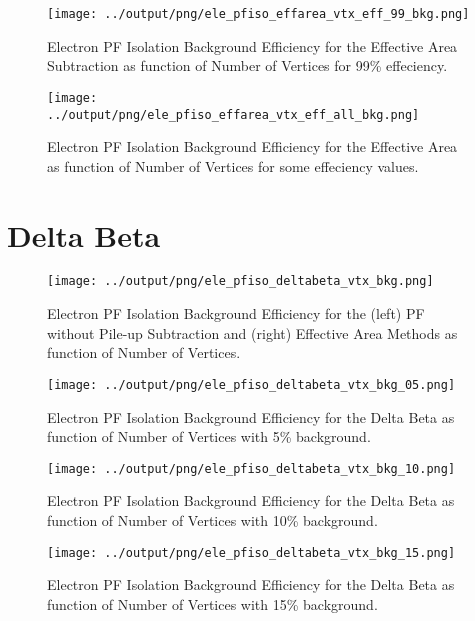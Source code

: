 \documentclass[11pt]{book}
\begin{document}
\begin{figure}[htb]
\centering
\texttt{[image: ../output/png/ele\_pfiso\_effarea\_vtx\_eff\_99\_bkg.png]}
\caption{Electron PF Isolation Background Efficiency for the Effective Area Subtraction as function of Number of Vertices for 99\% effeciency.}
\label{fig:ele_pfiso_vtx_eff_effarea_eff_99_bkg}
\end{figure}

\begin{figure}[htb]
\centering
\texttt{[image: ../output/png/ele\_pfiso\_effarea\_vtx\_eff\_all\_bkg.png]}
\caption{Electron PF Isolation Background Efficiency for the Effective Area as function of Number of Vertices for some effeciency values.}
\label{fig:ele_pfiso_vtx_eff_effarea_eff_all_bkg}
\end{figure}
\clearpage

\section{Delta Beta}
\begin{figure}[htb]
\centering
\texttt{[image: ../output/png/ele\_pfiso\_deltabeta\_vtx\_bkg.png]}
\caption{Electron PF Isolation Background Efficiency for the (left) PF without Pile-up Subtraction and (right) Effective Area Methods as function of Number of Vertices.}
\label{fig:ele_pfiso_vtx_bkg_deltabeta}
\end{figure}

\begin{figure}[htb]
\centering
\texttt{[image: ../output/png/ele\_pfiso\_deltabeta\_vtx\_bkg\_05.png]}
\caption{Electron PF Isolation Background Efficiency for the Delta Beta as function of Number of Vertices with 5\% background.}
\label{fig:ele_pfiso_vtx_bkg_deltabeta_bkg_05}
\end{figure}

\begin{figure}[htb]
\centering
\texttt{[image: ../output/png/ele\_pfiso\_deltabeta\_vtx\_bkg\_10.png]}
\caption{Electron PF Isolation Background Efficiency for the Delta Beta as function of Number of Vertices with 10\% background.}
\label{fig:ele_pfiso_vtx_bkg_deltabeta_bkg_10}
\end{figure}

\begin{figure}[htb]
\centering
\texttt{[image: ../output/png/ele\_pfiso\_deltabeta\_vtx\_bkg\_15.png]}
\caption{Electron PF Isolation Background Efficiency for the Delta Beta as function of Number of Vertices with 15\% background.}
\label{fig:ele_pfiso_vtx_bkg_deltabeta_bkg_15}
\end{figure}
\end{document}
